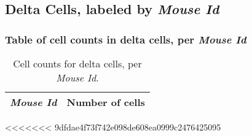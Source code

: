 \clearpage

\subsection{Delta Cells, labeled by \emph{Mouse Id}}
\subsubsection{Table of cell counts in delta cells, per \emph{Mouse Id}}\begin{table}[h]
\centering
\label{my-label}
\begin{tabular}{@{}ll@{}}
\toprule

\emph{Mouse Id}& Number of cells \\ \midrule\bottomrule
\end{tabular}
\caption{Cell counts for delta cells, per \emph{Mouse Id}.}
\end{table}

\clearpage
<<<<<<< 9dfdae4f73f742e098de608ea0999c2476425095
